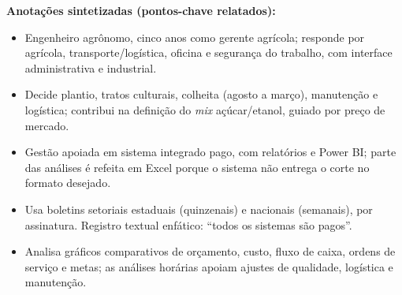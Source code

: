 \documentclass[11pt,a4paper]{article}
\begin{document}
\textbf{Anotações sintetizadas (pontos-chave relatados):}
\begin{itemize}
  \item Engenheiro agrônomo, cinco anos como gerente agrícola; responde por agrícola,
  transporte/logística, oficina e segurança do trabalho, com interface administrativa e
  industrial.
  \item Decide plantio, tratos culturais, colheita (agosto a março), manutenção e logística;
  contribui na definição do \textit{mix} açúcar/etanol, guiado por preço de mercado.
  \item Gestão apoiada em sistema integrado pago, com relatórios e Power BI; parte das análises
  é refeita em Excel porque o sistema não entrega o corte no formato desejado.
  \item Usa boletins setoriais estaduais (quinzenais) e nacionais (semanais), por assinatura.
  Registro textual enfático: ``todos os sistemas são pagos''.
  \item Analisa gráficos comparativos de orçamento, custo, fluxo de caixa, ordens de serviço e
  metas; as análises horárias apoiam ajustes de qualidade, logística e manutenção.
\end{itemize}
\end{document}
